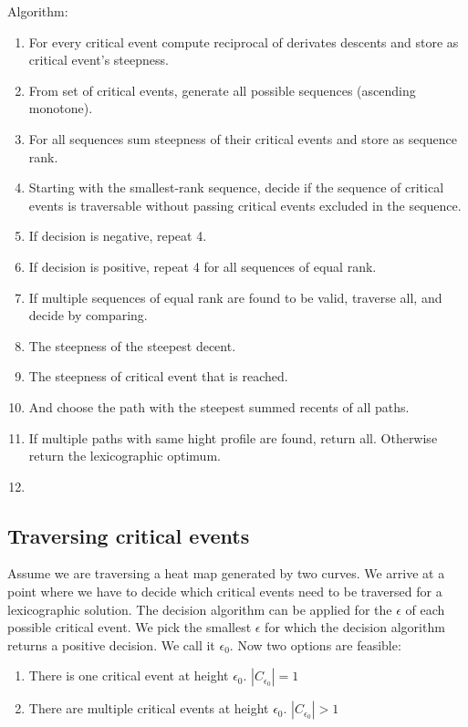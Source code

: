 Algorithm:
\begin{enumerate}
	\item For every critical event compute reciprocal of derivates descents and store as critical event's steepness.
	\item From set of critical events, generate all possible sequences (ascending monotone).
	\item For all sequences sum steepness of their critical events and store as sequence rank.
	\item Starting with the smallest-rank sequence, decide if the sequence of critical events is traversable without passing critical events excluded in the sequence.
	\item If decision is negative, repeat 4.
	\item If decision is positive, repeat 4 for all sequences of equal rank.
	\item If multiple sequences of equal rank are found to be valid, traverse all, and decide by comparing.
	\item The steepness of the steepest decent.
	\item The steepness of critical event that is reached.
	\item And choose the path with the steepest summed recents of all paths.
	\item If multiple paths with same hight profile are found, return all. Otherwise return the lexicographic optimum.
	\item 
\end{enumerate}

\subsection{Traversing critical events}

Assume we are traversing a heat map generated by two curves. We arrive at a point where we have to decide which critical events need to be traversed for a lexicographic solution. The decision algorithm\cite{altgodau} can be applied for the $\epsilon$ of each possible critical event. We pick the smallest $\epsilon$ for which the decision algorithm returns a positive decision. We call it $\epsilon_0$. Now two options are feasible:

\begin{enumerate}[label=(\Alph*)]
	\item There is one critical event at height $\epsilon_0$. $|C_{\epsilon_0}| = 1$
	\item There are multiple critical events at height $\epsilon_0$. $|C_{\epsilon_0}| > 1$
\end{enumerate}

